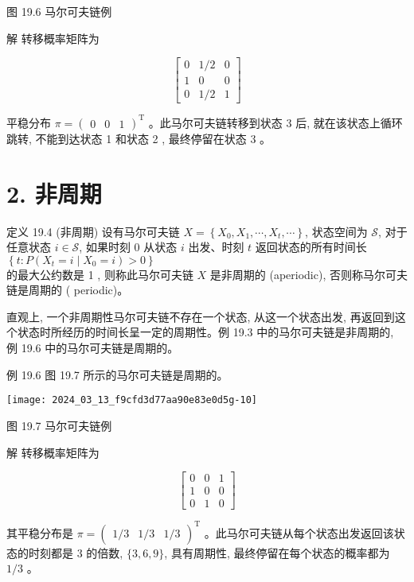\documentclass[10pt]{article}
\begin{document}
\begin{CJK*}{UTF8}{bsmi}
图 19.6 马尔可夫链例

解 转移概率矩阵为

$$
\left[\begin{array}{ccc}
0 & 1 / 2 & 0 \\
1 & 0 & 0 \\
0 & 1 / 2 & 1
\end{array}\right]
$$

平稳分布 $\pi=\left(\begin{array}{lll}0 & 0 & 1\end{array}\right)^{\mathrm{T}}$ 。此马尔可夫链转移到状态 3 后, 就在该状态上循环跳转, 不能到达状态 1 和状态 2 , 最终停留在状态 3 。

\section*{2. 非周期}
定义 19.4 (非周期) 设有马尔可夫链 $X=\left\{X_{0}, X_{1}, \cdots, X_{t}, \cdots\right\}$, 状态空间为 $\mathcal{S}$, 对于任意状态 $i \in \mathcal{S}$, 如果时刻 0 从状态 $i$ 出发、时刻 $t$ 返回状态的所有时间长 $\left\{t: P\left(X_{t}=i \mid X_{0}=i\right)>0\right\}$\\
的最大公约数是 1 , 则称此马尔可夫链 $X$ 是非周期的 (aperiodic), 否则称马尔可夫链是周期的 ( periodic)。

直观上, 一个非周期性马尔可夫链不存在一个状态, 从这一个状态出发, 再返回到这个状态时所经历的时间长呈一定的周期性。例 19.3 中的马尔可夫链是非周期的, 例 19.6 中的马尔可夫链是周期的。

例 19.6 图 19.7 所示的马尔可夫链是周期的。

\begin{center}
\texttt{[image: 2024\_03\_13\_f9cfd3d77aa90e83e0d5g-10]}
\end{center}

图 19.7 马尔可夫链例

解 转移概率矩阵为

$$
\left[\begin{array}{lll}
0 & 0 & 1 \\
1 & 0 & 0 \\
0 & 1 & 0
\end{array}\right]
$$

其平稳分布是 $\pi=\left(\begin{array}{lll}1 / 3 & 1 / 3 & 1 / 3\end{array}\right)^{\mathrm{T}}$ 。此马尔可夫链从每个状态出发返回该状态的时刻都是 3 的倍数, $\{3,6,9\}$, 具有周期性, 最终停留在每个状态的概率都为 $1 / 3$ 。


\end{CJK*}
\end{document}
